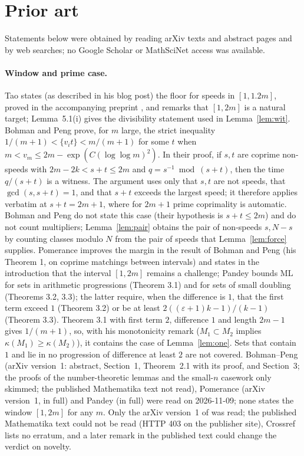 \documentclass[11pt]{article}
\theoremstyle{remark}
\newcommand{\ML}{\mathrm{ML}}
\begin{document}
\section{Prior art}\label{sec:prior}

Statements below were obtained by reading arXiv texts and abstract pages and by web searches; no Google Scholar or MathSciNet access was available.

\paragraph{Window and prime case.} Tao \cite{TaoBlog} states (as described in his blog post) the floor for speeds in $[1,1.2m]$, proved in the accompanying preprint \cite{Tao17}, and remarks that $[1,2m]$ is a natural target; Lemma~5.1(i) gives the divisibility statement used in Lemma~\ref{lem:wit}. Bohman and Peng \cite{BP22} prove, for $m$ large, the strict inequality $1/(m+1)<\{v_it\}<m/(m+1)$ for some $t$ when $m<v_m\le 2m-\exp(C(\log\log m)^2)$. In their proof, if $s,t$ are coprime non-speeds with $2m-2k<s+t\le 2m$ and $q=s^{-1}\bmod(s+t)$, then the time $q/(s+t)$ is a witness. The argument uses only that $s,t$ are not speeds, that $\gcd(s,s+t)=1$, and that $s+t$ exceeds the largest speed; it therefore applies verbatim at $s+t=2m+1$, where for $2m+1$ prime coprimality is automatic. Bohman and Peng do not state this case (their hypothesis is $s+t\le2m$) and do not count multipliers; Lemma~\ref{lem:pair} obtains the pair of non-speeds $s,N-s$ by counting classes modulo $N$ from the pair of speeds that Lemma~\ref{lem:force} supplies. Pomerance \cite{Pomerance22} improves the margin in the result of Bohman and Peng (his Theorem 1, on coprime matchings between intervals) and states in the introduction that the interval $[1,2m]$ remains a challenge; Pandey \cite{Pandey10} bounds $\ML$ for sets in arithmetic progressions (Theorem 3.1) and for sets of small doubling (Theorems 3.2, 3.3); the latter require, when the difference is $1$, that the first term exceed $1$ (Theorem 3.2) or be at least $2((\varepsilon+1)k-1)/(k-1)$ (Theorem 3.3). Theorem 3.1 with first term $2$, difference $1$ and length $2m-1$ gives $1/(m+1)$, so, with his monotonicity remark ($M_1\subset M_2$ implies $\kappa(M_1)\ge\kappa(M_2)$), it contains the case of Lemma~\ref{lem:one}. Sets that contain $1$ and lie in no progression of difference at least $2$ are not covered. Bohman--Peng (arXiv version~1: abstract, Section~1, Theorem~2.1 with its proof, and Section~3; the proofs of the number-theoretic lemmas and the small-$n$ casework only skimmed; the published Mathematika text not read), Pomerance (arXiv version~1, in full) and Pandey (in full) were read on 2026-11-09; none states the window $[1,2m]$ for any $m$. Only the arXiv version~1 of \cite{BP22} was read; the published Mathematika text could not be read (HTTP 403 on the publisher site), Crossref lists no erratum, and a later remark in the published text could change the verdict on novelty.
\end{document}
